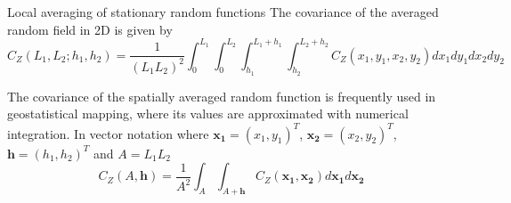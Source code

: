 \documentclass[8pt]{beamer}
\renewcommand{\emph}[1]{\textcolor{myorange}{#1}}
\begin{document}
\begin{frame}{Local averaging of stationary random functions}
    The \emph{covariance} of the \emph{averaged random field} in 2D is given by
    \[
        C_Z (L_1, L_2; h_1, h_2) = \frac{1}{(L_1 L_2)^2} \int_{0}^{L_1}\int_{0}^{L_2}\int_{h_1}^{L_1 + h_1}\int_{h_2}^{L_2 + h_2} C_Z ( x_1, y_1, x_2, y_2) dx_1 dy_1 dx_2 dy_2
    \]

    The \emph{covariance} of the \emph{spatially averaged random function} is frequently used in \emph{geostatistical mapping}, where its values are approximated with \emph{numerical integration}. In vector notation where $\mathbf{x_1} = (x_1, y_1)^T$, $\mathbf{x_2} = (x_2, y_2)^T$, $\mathbf{h} = (h_1, h_2)^T$ and $A= L_1 L_2$
    \[
        C_Z (A, \mathbf{h}) = \frac{1}{A^2} \int_A \int_{A+\mathbf{h}} C_Z (\mathbf{x_1}, \mathbf{x_2}) d\mathbf{x_1} d\mathbf{x_2} 
    \]


\end{frame}
\end{document}
